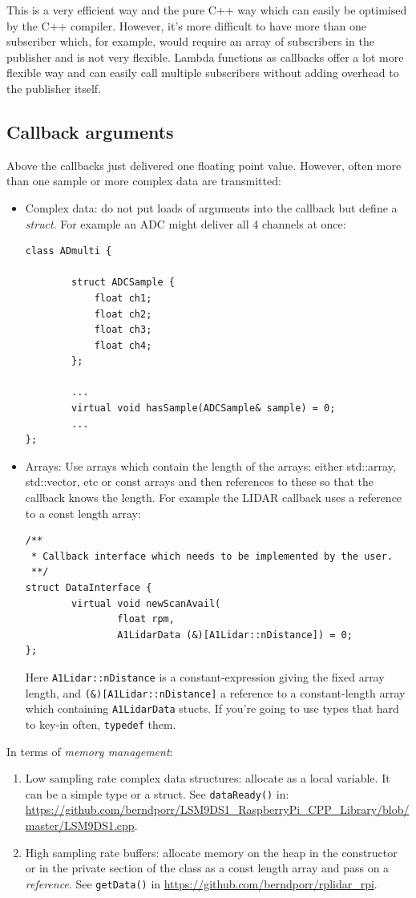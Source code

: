 \documentclass[12pt]{report}
\begin{document}
This is a very efficient way and the pure C++ way which can easily be optimised by the C++
compiler. However, it's more difficult to have more than one subscriber which, for example,
would require an array of subscribers in the publisher and is not very flexible. Lambda
functions as callbacks offer a lot more flexible way and can easily call multiple subscribers
without adding overhead to the publisher itself.

\subsection{Callback arguments}
Above the callbacks just delivered one floating point value. However,
often more than one sample or more complex data are transmitted:
\begin{itemize}
\item Complex data: do not put loads of arguments into the
  callback but define a \textsl{struct}. For example an ADC might
  deliver all 4 channels at once:
\begin{verbatim}
class ADmulti {

        struct ADCSample {
            float ch1;
            float ch2;
            float ch3;
            float ch4;
        };

        ...
        virtual void hasSample(ADCSample& sample) = 0;
        ...
};
\end{verbatim}
\item Arrays: Use arrays which contain the length of the arrays:
  either std::array, std::vector, etc or const arrays and then
  references to these so that the callback knows the length.
  For example the LIDAR callback uses a reference to a const length
  array:
\begin{verbatim}
/**
 * Callback interface which needs to be implemented by the user.
 **/
struct DataInterface {
        virtual void newScanAvail(
                float rpm, 
                A1LidarData (&)[A1Lidar::nDistance]) = 0;
};
\end{verbatim}
Here \texttt{A1Lidar::nDistance} is a constant-expression giving the fixed array length,
and \texttt{(\&)[A1Lidar::nDistance]} a reference to a constant-length array which
containing \texttt{A1LidarData} stucts. If you're going to use types that hard to key-in
often, \texttt{typedef} them.
\end{itemize}
In terms of \textsl{memory management}:
\begin{enumerate}
\item Low sampling rate complex data structures: allocate as a local variable. It can be a simple type
  or a struct. See \texttt{dataReady()} in: \url{https://github.com/berndporr/LSM9DS1_RaspberryPi_CPP_Library/blob/master/LSM9DS1.cpp}.
\item High sampling rate buffers: allocate memory on the heap in the
  constructor or in the private section of the class as a const length
  array and pass on a \textsl{reference}. See \texttt{getData()} in
  \url{https://github.com/berndporr/rplidar_rpi}.
\end{enumerate}
\end{document}
